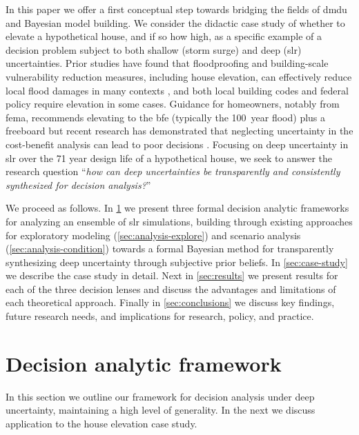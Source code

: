 \documentclass[11pt]{article}
\begin{document}
In this paper we offer a first conceptual step towards bridging the fields of \gls{dmdu} and Bayesian model building.
We consider the didactic case study of whether to elevate a hypothetical house, and if so how high, as a specific example of a decision problem subject to both shallow (storm surge) and deep (\gls{slr}) uncertainties.
Prior studies have found that floodproofing and building-scale vulnerability reduction measures, including house elevation, can effectively reduce local flood damages in many contexts \citep{demoel_reducing:2014,deruig_building:2020,kreibich_building:2005,slotter_floodproofing:2020,Rozer:2016dn,mobley_mitigation:2020,aerts_cost:2018}, and both local building codes \citep{asce_7-10:2013,bruneau_multihazard:2017,asce_24-05:2006} and federal policy \citep{FEMA_p-55:2011} require elevation in some cases.
Guidance for homeowners, notably from \gls{fema}, recommends elevating to the \gls{bfe} (typically the \SI{100}{year} flood) plus a freeboard \citep{fema_retrofitting:2014,asce_24-14:2015,fema_retrofitting:2014} but recent research has demonstrated that neglecting uncertainty in the cost-benefit analysis can lead to poor decisions \citep{zarekarizi_suboptimal:2020}.
Focusing on deep uncertainty in \gls{slr} over the 71 year design life of a hypothetical house, we seek to answer the research question ``\emph{how can deep uncertainties be transparently and consistently synthesized for decision analysis?}''

We proceed as follows.
In \cref{sec:analysis} we present three formal decision analytic frameworks for analyzing an ensemble of \gls{slr} simulations, building through existing approaches for exploratory modeling (\cref{sec:analysis-explore}) and scenario analysis (\cref{sec:analysis-condition}) towards a formal Bayesian method for transparently synthesizing deep uncertainty through subjective prior beliefs.
In \cref{sec:case-study} we describe the case study in detail.
Next in \cref{sec:results} we present results for each of the three decision lenses and discuss the advantages and limitations of each theoretical approach.
Finally in \cref{sec:conclusions} we discuss key findings, future research needs, and implications for research, policy, and practice.

\section{Decision analytic framework}\label{sec:analysis}

In this section we outline our framework for decision analysis under deep uncertainty, maintaining a high level of generality.
In the next we discuss application to the house elevation case study.
\end{document}
